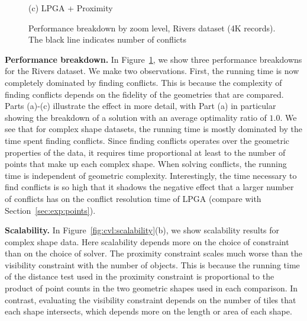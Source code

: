 \documentclass[11pt, oneside]{report}
\newcommand{\minisec}[1]{\noindent\textbf{#1.}}
\begin{document}
{\begin{figure}[tb]
\begin{minipage}{0.329\linewidth}
    \centerline{(c) LPGA + Proximity}
  \end{minipage}
  \caption{Performance breakdown by zoom level, Rivers dataset (4K records). The black line indicates number of conflicts} \label{fig:performance:complex}
\end{figure}


\minisec{Performance breakdown}
In Figure~\ref{fig:performance:complex}, we show three performance breakdowns for the Rivers dataset. We make two observations. First, the running time is now completely dominated by finding conflicts. This is because the complexity of finding conflicts depends on the fidelity of the geometries that are compared. 
Parts (a)-(c) illustrate the effect in more detail, with Part (a) in particular showing the breakdown of a solution with an average optimality ratio of $1.0$. We see that for complex shape datasets, the running time is mostly dominated by the time spent finding conflicts. Since finding conflicts operates over the geometric properties of the data, it requires time proportional at least to the number of points that make up each complex shape. When solving conflicts, the running time is independent of geometric complexity. Interestingly, the time necessary to find conflicts is so high that it shadows the negative effect that a larger number of conflicts has on the conflict resolution time of LPGA (compare with Section~\ref{sec:exp:points}).


\minisec{Scalability}
In Figure~\ref{fig:cvl:scalability}(b), we show scalability results for complex shape data. Here scalability depends more on the choice of constraint than on the choice of solver. The proximity constraint scales much worse than the visibility constraint with the number of objects. This is because the running time of the distance test used in the proximity constraint is proportional to the product of point counts in the two geometric shapes used in each comparison. In contrast, evaluating the visibility constraint depends on the number of tiles that each shape intersects, which depends more on the length or area of each shape. 

}
\end{document}
